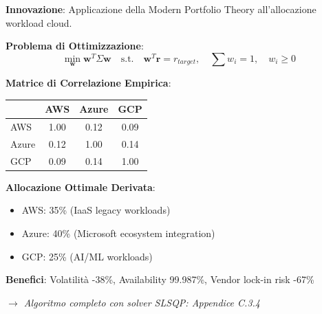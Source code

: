 \begin{tcolorbox}[
    colback=purple!5!white,
    colframe=purple!65!black,
    title={\textbf{Innovation Box 3.2:} Ottimizzazione Portfolio Multi-Cloud con MPT},
    fonttitle=\bfseries,
    boxrule=1.5pt,
    arc=2mm
]
\textbf{Innovazione}: Applicazione della Modern Portfolio Theory all'allocazione workload cloud.

\vspace{0.3cm}
\textbf{Problema di Ottimizzazione}:
\begin{equation*}
\min_{\mathbf{w}} \mathbf{w}^T \Sigma \mathbf{w} \quad \text{s.t.} \quad \mathbf{w}^T \mathbf{r} = r_{target}, \quad \sum w_i = 1, \quad w_i \geq 0
\end{equation*}

\vspace{0.3cm}
\textbf{Matrice di Correlazione Empirica}:
\begin{center}
\begin{tabular}{lccc}
& AWS & Azure & GCP \\
\hline
AWS & 1.00 & 0.12 & 0.09 \\
Azure & 0.12 & 1.00 & 0.14 \\
GCP & 0.09 & 0.14 & 1.00 \\
\end{tabular}
\end{center}

\vspace{0.3cm}
\textbf{Allocazione Ottimale Derivata}:
\begin{itemize}%
    \item AWS: 35\% (IaaS legacy workloads)
    \item Azure: 40\% (Microsoft ecosystem integration)
    \item GCP: 25\% (AI/ML workloads)
\end{itemize}

\textbf{Benefici}: Volatilità -38\%, Availability 99.987\%, Vendor lock-in risk -67\%

\textit{$\rightarrow$ Algoritmo completo con solver SLSQP: Appendice C.3.4}
\end{tcolorbox}

